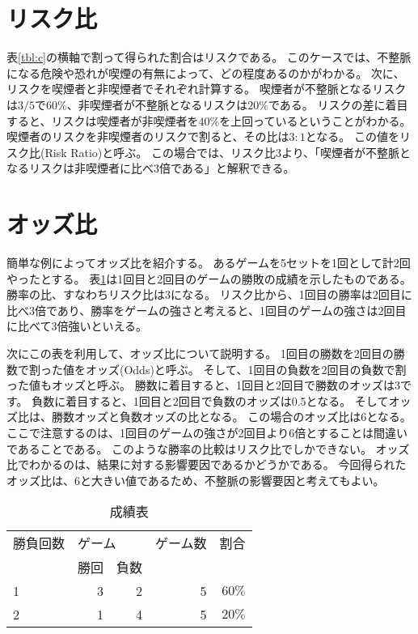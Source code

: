 \documentclass{ltjsarticle}
\begin{document}
\section{リスク比}
表\ref{tbl:c}の横軸で割って得られた割合はリスクである。
このケースでは、不整脈になる危険や恐れが喫煙の有無によって、どの程度あるのかがわかる。
次に、リスクを喫煙者と非喫煙者でそれぞれ計算する。
喫煙者が不整脈となるリスクは$3/5$で$60\%$、非喫煙者が不整脈となるリスクは$20\%$である。
リスクの差に着目すると、リスクは喫煙者が非喫煙者を$40\%$を上回っているということがわかる。
喫煙者のリスクを非喫煙者のリスクで割ると、その比は$3:1$となる。
この値をリスク比(Risk Ratio)と呼ぶ。
この場合では、リスク比3より、「喫煙者が不整脈となるリスクは非喫煙者に比べ3倍である」と解釈できる。

\section{オッズ比}
簡単な例によってオッズ比を紹介する。
あるゲームを5セットを1回として計2回やったとする。
表\ref{tbl:score}は1回目と2回目のゲームの勝敗の成績を示したものである。
勝率の比、すなわちリスク比は3になる。
リスク比から、1回目の勝率は2回目に比べ3倍であり、勝率をゲームの強さと考えると、1回目のゲームの強さは2回目に比べて3倍強いといえる。

次にこの表を利用して、オッズ比について説明する。
1回目の勝数を2回目の勝数で割った値をオッズ(Odds)と呼ぶ。
そして、1回目の負数を2回目の負数で割った値もオッズと呼ぶ。
勝数に着目すると、1回目と2回目で勝数のオッズは3です。
負数に着目すると、1回目と2回目で負数のオッズは0.5となる。
そしてオッズ比は、勝数オッズと負数オッズの比となる。
この場合のオッズ比は6となる。
ここで注意するのは、1回目のゲームの強さが2回目より6倍とすることは間違いであることである。
このような勝率の比較はリスク比でしかできない。
オッズ比でわかるのは、結果に対する影響要因であるかどうかである。
今回得られたオッズ比は、6と大きい値であるため、不整脈の影響要因と考えてもよい。

\begin{table}[b]
    \caption{成績表}
    \label{tbl:score}
    \centering
    \begin{tabular}{l|r|r|r|r} \hline 
        \multicolumn{1}{l}{勝負回数} & \multicolumn{2}{|l|}{ゲーム} & \multicolumn{1}{l|}{ゲーム数} & \multicolumn{1}{l}{割合}\\ \cline{2-3}
        & 勝回 & 負数 & & \\ \hline \hline
        1 & 3 & 2 & 5 & $60\%$ \\
        2 & 1 & 4 & 5 & $20\%$ \\ \hline 
    \end{tabular}
\end{table}
\end{document}
